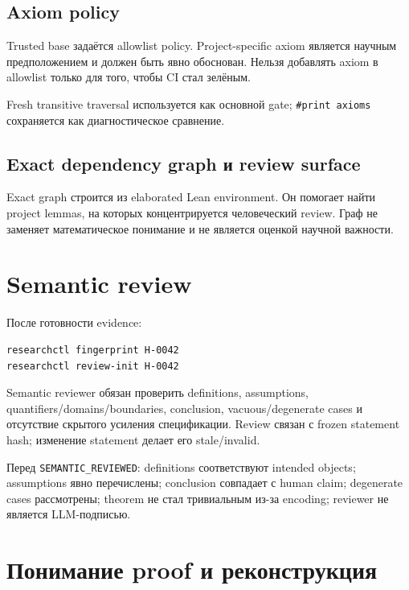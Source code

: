 \documentclass[11pt,a4paper]{article}
\newcommand{\status}[1]{\texttt{#1}}
\begin{document}
\subsection{Axiom policy}

Trusted base задаётся allowlist policy. Project-specific axiom является научным предположением и должен быть явно обоснован. Нельзя добавлять axiom в allowlist только для того, чтобы CI стал зелёным.

Fresh transitive traversal используется как основной gate; \texttt{\#print axioms} сохраняется как диагностическое сравнение.

\subsection{Exact dependency graph и review surface}

Exact graph строится из elaborated Lean environment. Он помогает найти project lemmas, на которых концентрируется человеческий review. Граф не заменяет математическое понимание и не является оценкой научной важности.

\section{Semantic review}

После готовности evidence:

\begin{lstlisting}
researchctl fingerprint H-0042
researchctl review-init H-0042
\end{lstlisting}

Semantic reviewer обязан проверить definitions, assumptions, quantifiers/domains/boundaries, conclusion, vacuous/degenerate cases и отсутствие скрытого усиления спецификации. Review связан с frozen statement hash; изменение statement делает его stale/invalid.

\begin{checklistbox}
Перед \status{SEMANTIC\_REVIEWED}: definitions соответствуют intended objects; assumptions явно перечислены; conclusion совпадает с human claim; degenerate cases рассмотрены; theorem не стал тривиальным из-за encoding; reviewer не является LLM-подписью.
\end{checklistbox}

\section{Понимание proof и реконструкция}
\end{document}
